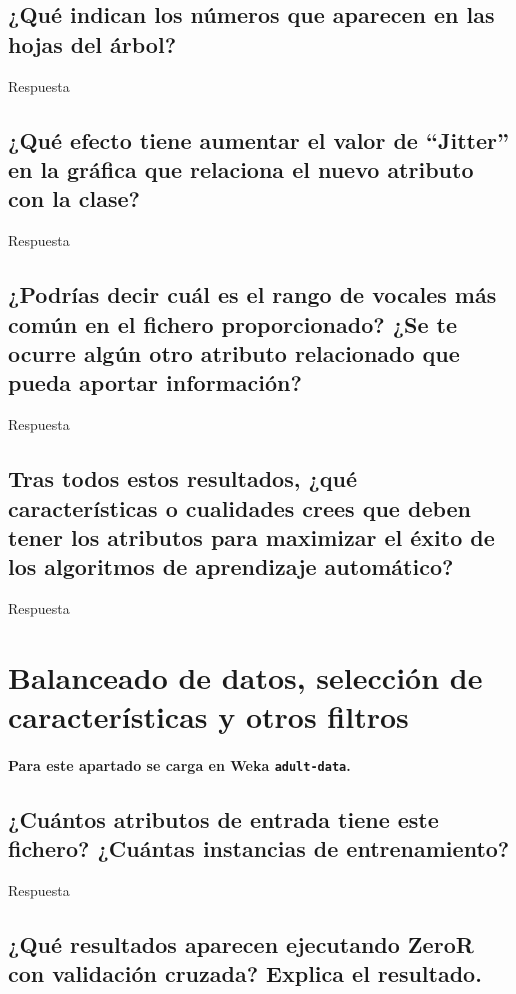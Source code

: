 \documentclass[12pt]{article}
\begin{document}
\subsection*{\small ¿Qué indican los números que aparecen en las hojas del
árbol?}

Respuesta

\subsection*{\small ¿Qué efecto tiene aumentar el valor de ``Jitter'' en la
gráfica que relaciona el nuevo atributo con la clase?}

Respuesta

\subsection*{\small ¿Podrías decir cuál es el rango de vocales más común en el
fichero proporcionado? ¿Se te ocurre algún otro atributo relacionado que pueda
aportar información?}

Respuesta

\subsection*{\small Tras todos estos resultados, ¿qué características o
cualidades crees que deben tener los atributos para maximizar el éxito de los
algoritmos de aprendizaje automático?}

Respuesta

\newpage

\section{Balanceado de datos, selección de características y otros filtros}

\paragraph{\small Para este apartado se carga en Weka \texttt{adult-data}.}

\subsection*{\small ¿Cuántos atributos de entrada tiene este fichero? ¿Cuántas
instancias de entrenamiento?}

Respuesta

\subsection*{\small ¿Qué resultados aparecen ejecutando ZeroR con validación
cruzada? Explica el resultado.}
\end{document}
